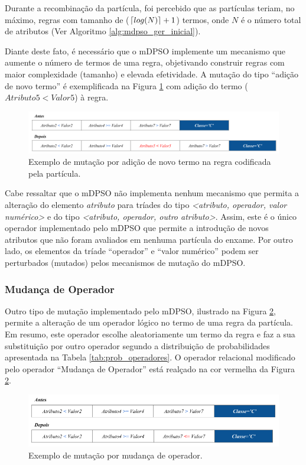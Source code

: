 \documentclass[
	12pt,				%
	openany,			%
	oneside,	
	a4paper,			%
	brazil,				%
	]{unimontes-ppgmsc-abntex2}
\DeclarePairedDelimiter{\ceil}{\lceil}{\rceil}
\begin{document}
Durante a recombinação da partícula, foi percebido que as partículas teriam, no máximo, regras com tamanho de ($\ceil{log(N)} + 1$) termos, onde $N$ é o número total de atributos (Ver Algoritmo \ref{alg:mdpso_ger_inicial}). 

Diante deste fato, é necessário que o mDPSO implemente um mecanismo que aumente o número de termos de uma regra, objetivando construir regras com maior complexidade (tamanho) e elevada efetividade.  A mutação do tipo ``adição de novo termo'' é exemplificada na Figura \ref{fig:mut_1} com adição do termo ($Atributo5 < Valor5$) à regra. 

\begin{figure}[ht]
\centering
\includegraphics[scale=.5]{img/mut_1}
\caption{Exemplo de mutação por adição de novo termo na regra codificada pela partícula.}
\label{fig:mut_1}
\end{figure}

Cabe ressaltar que o mDPSO não implementa nenhum mecanismo que permita a alteração do elemento {\em atributo} para tríades do tipo \textit{<atributo, operador, valor numérico>} e do tipo \textit{<atributo, operador, outro atributo>}. Assim, este é o único operador implementado pelo mDPSO que permite a introdução de novos atributos que não foram avaliados em nenhuma partícula do enxame. Por outro lado, os elementos da tríade ``operador'' e ``valor numérico'' podem ser perturbados (mutados) pelos mecanismos de mutação do mDPSO.

\subsubsection{Mudança de Operador}
\label{sec:mdpso_mut2} 

Outro tipo de mutação implementado pelo mDPSO, ilustrado na Figura \ref{fig:mut_2}, permite a alteração de um operador lógico no termo de uma regra da partícula. Em resumo, este operador escolhe aleatoriamente um termo da regra e faz a sua substituição por outro operador segundo a distribuição de probabilidades apresentada na Tabela \ref{tab:prob_operadores}. O operador relacional modificado pelo operador ``Mudança de Operador'' está realçado na cor vermelha da Figura \ref{fig:mut_2}.

\begin{figure}[ht]
\centering
\includegraphics[scale=.5]{img/mut_2}
\caption{Exemplo de mutação por mudança de operador.}
\label{fig:mut_2}
\end{figure}
\end{document}
